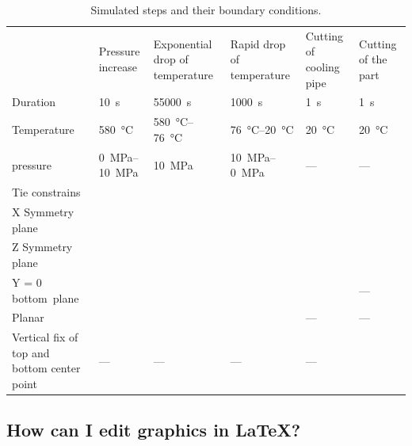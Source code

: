 \begin{table}
	\begin{fullpage} %
			\centering
			\footnotesize 	\begin{tabularx}{\linewidth}{>{\raggedright\arraybackslash}X >{\centering\arraybackslash}X >{\centering\arraybackslash}X >{\centering\arraybackslash}X >{\centering\arraybackslash}X >{\centering\arraybackslash}X}
			  \toprule
			  & Pressure increase & Exponential drop of temperature & Rapid drop of temperature & Cutting of cooling pipe & Cutting of the part \\
			  \cmidrule(r){2-4} \cmidrule(l){5-6}
			  Duration & \qty{10}{\second} & \qty{55000}{\second} & \qty{1000}{\second} & \qty{1}{\second} & \qty{1}{\second} \\
			  \midrule
			  Temperature  & \qty{580}{\celsius} & \qtyrange[range-units=single]{580}{76}{\celsius} & \qtyrange[range-units=single]{76}{20}{\celsius} & \qty{20}{\celsius} & \qty{20}{\celsius} \\
			  \midrule
			  \glsxtrshort{HRP} pressure & \qtyrange[range-units=single]{0}{10}{\mega\pascal} & \qty{10}{\mega\pascal} & \qtyrange[range-units=single]{10}{0}{\mega\pascal} & --- & --- \\
			  \midrule
			  Tie constrains & \checkmark & \checkmark & \checkmark & \checkmark &  \checkmark \\
			  \midrule
			  X Symmetry plane & \checkmark & \checkmark & \checkmark & \checkmark &  \checkmark \\
			  Z Symmetry plane & \checkmark & \checkmark & \checkmark & \checkmark &  \checkmark \\
			  Y = 0 \mbox{bottom plane} & \checkmark & \checkmark & \checkmark & \checkmark & ---  \\
			  \midrule
			  Planar \glsxtrshort{BC} & \checkmark & \checkmark & \checkmark & ---  & --- \\
			  \midrule
			  Vertical fix of top and bottom center point & --- & --- & --- & --- & \checkmark \\
			  \bottomrule
			\end{tabularx}
			\caption{Simulated steps and their boundary conditions.}
			\label{tab:fem-steps}
	\end{fullpage}
\end{table}

\subsection{How can I edit graphics in \LaTeX?}

